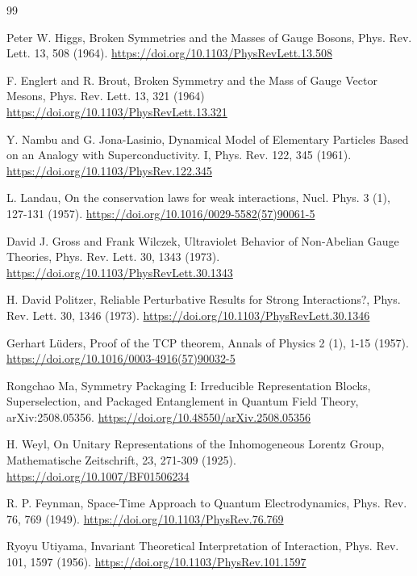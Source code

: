 \documentclass[12pt,a4paper]{article}
\begin{document}
\begin{thebibliography}{99}
	
	Peter W. Higgs,
	Broken Symmetries and the Masses of Gauge Bosons,
	Phys. Rev. Lett. 13, 508 (1964).
	\url{https://doi.org/10.1103/PhysRevLett.13.508}
	
	
	F. Englert and R. Brout,
	Broken Symmetry and the Mass of Gauge Vector Mesons,
	Phys. Rev. Lett. 13, 321 (1964)
	\url{https://doi.org/10.1103/PhysRevLett.13.321}
	
	
	Y. Nambu and G. Jona-Lasinio,
	Dynamical Model of Elementary Particles Based on an Analogy with Superconductivity. I,	
	Phys. Rev. 122, 345 (1961).
	\url{https://doi.org/10.1103/PhysRev.122.345}
	
	
	L. Landau,
	On the conservation laws for weak interactions,
	Nucl. Phys. 3 (1), 127-131 (1957).
	\url{https://doi.org/10.1016/0029-5582(57)90061-5}
	
	
	David J. Gross and Frank Wilczek,
	Ultraviolet Behavior of Non-Abelian Gauge Theories,
	Phys. Rev. Lett. 30, 1343 (1973).
	\url{https://doi.org/10.1103/PhysRevLett.30.1343}
	
	
	H. David Politzer,
	Reliable Perturbative Results for Strong Interactions?,
	Phys. Rev. Lett. 30, 1346 (1973).
	\url{https://doi.org/10.1103/PhysRevLett.30.1346}
	
	
	Gerhart Lüders,
	Proof of the TCP theorem,
	Annals of Physics 2 (1), 1-15 (1957).
	\url{https://doi.org/10.1016/0003-4916(57)90032-5}
		
	
	Rongchao Ma, 
	Symmetry Packaging I: Irreducible Representation Blocks, Superselection, and Packaged Entanglement in Quantum Field Theory, 
	arXiv:2508.05356.
	\url{https://doi.org/10.48550/arXiv.2508.05356}
	
	
	H. Weyl, 
	On Unitary Representations of the Inhomogeneous Lorentz Group, 
	Mathematische Zeitschrift, 23, 271-309 (1925).
	\url{https://doi.org/10.1007/BF01506234}
	
	
	R. P. Feynman, 
	Space-Time Approach to Quantum Electrodynamics, 
	Phys. Rev. 76, 769 (1949).
	\url{https://doi.org/10.1103/PhysRev.76.769}
	
		
	Ryoyu Utiyama, 
	Invariant Theoretical Interpretation of Interaction, 
	Phys. Rev. 101, 1597 (1956).
	\url{https://doi.org/10.1103/PhysRev.101.1597}
	

\end{thebibliography}
\end{document}
